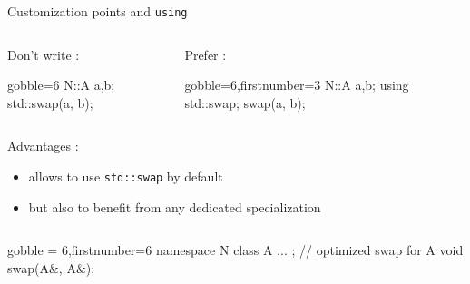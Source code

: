 \begin{frame}[fragile]
  \begin{block}{Customization points and \texttt{using}}
    \begin{columns}[t]
      \begin{column}{.35\textwidth}
        Don't write :
        \begin{cppcode*}{gobble=6}
          N::A a,b;
          std::swap(a, b);
        \end{cppcode*}
      \end{column}
      \begin{column}{.35\textwidth}
        Prefer :
        \begin{cppcode*}{gobble=6,firstnumber=3}
          N::A a,b;
          using std::swap;
          swap(a, b);
        \end{cppcode*}
      \end{column}
    \end{columns}
    \vspace{.2cm}
    Advantages :
    \begin{itemize}
    \item allows to use \texttt{std::swap} by default
    \item but also to benefit from any dedicated specialization
    \end{itemize}
    \begin{columns}
      \begin{column}{.7\textwidth}
        \begin{cppcode*}{gobble = 6,firstnumber=6}
          namespace N {
            class A { ... };
            // optimized swap for A
            void swap(A&, A&);
          }
        \end{cppcode*}
      \end{column}
    \end{columns}
  \end{block}
\end{frame}
